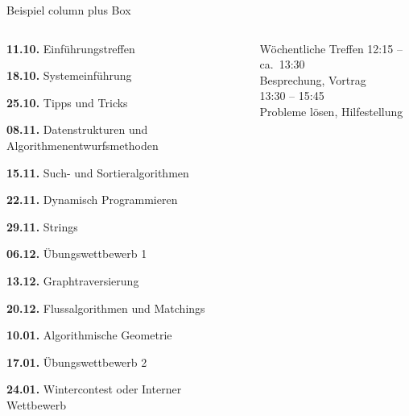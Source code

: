 \documentclass[aspectratio=169,xcolor=dvipsnames, t]{beamer}
\begin{document}
\begin{frame}{Beispiel column plus Box}
	\vspace{-0.5cm}
	\begin{columns}
		\begin{column}{.65\linewidth}
			\begin{itemize}
				{\small
				\item { \bf 11.10.} Einf\"uhrungstreffen
				\item { \bf 18.10.} Systemeinf\"uhrung
				\item { \bf 25.10.} Tipps und Tricks
				\item { \bf 08.11.} Datenstrukturen und Algorithmenentwurfsmethoden
				\item { \bf 15.11.} Such- und Sortieralgorithmen
				\item { \bf 22.11.} Dynamisch Programmieren
				\item { \bf 29.11.} Strings
				\item { \bf 06.12.} \"Ubungswettbewerb 1
				\item { \bf 13.12.} Graphtraversierung
				\item { \bf 20.12.} Flussalgorithmen und Matchings
				\item { \bf 10.01.} Algorithmische Geometrie
				\item { \bf 17.01.} \"Ubungswettbewerb 2
				\item { \bf 24.01.} Wintercontest oder Interner Wettbewerb 
    		}
			\end{itemize}
		\end{column}
		\begin{column}{.25\linewidth}
			\begin{block}{W\"ochentliche Treffen}
				12:15 -- ca.\ 13:30\\
				Besprechung, Vortrag\\
				13:30 -- 15:45\\
				Probleme l\"osen, Hilfestellung
			\end{block}
		\end{column}
	\end{columns}

\end{frame}
\end{document}

